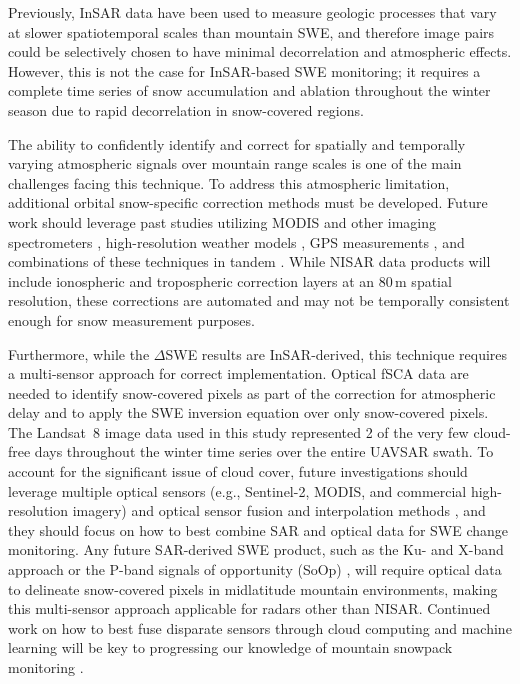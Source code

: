 Previously, InSAR data have been used to measure geologic processes that vary at slower spatiotemporal scales than mountain SWE, and therefore image pairs could be selectively chosen to have minimal decorrelation and atmospheric effects. However, this is not the case for InSAR-based SWE monitoring; it requires a complete time series of snow accumulation and ablation throughout the winter season due to rapid decorrelation in snow-covered regions.

The ability to confidently identify and correct for spatially and temporally varying atmospheric signals over mountain range scales is one of the main challenges facing this technique. To address this atmospheric limitation, additional orbital snow-specific correction methods must be developed. Future work should leverage past studies utilizing MODIS and other imaging spectrometers \citep{liAdvancedInSARAtmospheric2009}, high-resolution weather models \citep{liuValueHighresolutionWeather2009}, GPS measurements \citep{liInterferometricSyntheticAperture2006}, and combinations of these techniques in tandem \citep{bekaertStatisticalComparisonInSAR2015}. While NISAR data products will include ionospheric and tropospheric correction layers at an 80\,m spatial resolution, these corrections are automated and may not be temporally consistent enough for snow measurement purposes.

Furthermore, while the $\Delta$SWE results are InSAR-derived, this technique requires a multi-sensor approach for correct implementation. Optical fSCA data are needed to identify snow-covered pixels as part of the correction for atmospheric delay and to apply the SWE inversion equation over only snow-covered pixels. The Landsat~8 image data used in this study represented 2 of the very few cloud-free days throughout the winter time series over the entire UAVSAR swath. To account for the significant issue of cloud cover, future investigations should leverage multiple optical sensors (e.g., Sentinel-2, MODIS, and commercial high-resolution imagery) and optical sensor fusion and interpolation methods \citep{rittgerMultisensorFusionUsing2021,dozierTimeSpaceContinuity2008}, and they should focus on how to best combine SAR and optical data for SWE change monitoring. Any future SAR-derived SWE product, such as the Ku- and X-band approach \citep{tsangReviewArticleGlobal2022} or the P-band signals of opportunity (SoOp) \citep{yuehSatelliteSyntheticAperture2021}, will require optical data to delineate snow-covered pixels in midlatitude mountain environments, making this multi-sensor approach applicable for radars other than NISAR. Continued work on how to best fuse disparate sensors through cloud computing and machine learning will be key to progressing our knowledge of mountain snowpack monitoring  \citep{durandAchievingBreakthroughsGlobal2021}.

